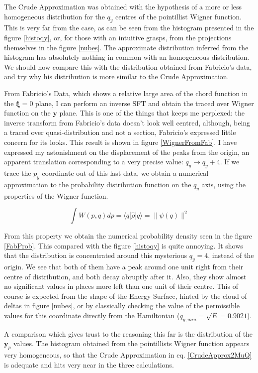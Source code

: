 \documentclass[a4paper,12pt]{article}
\newcommand{\yfase}{\mathbf{y}}
\newcommand{\xifase}{ {\boldsymbol{\xi}} }
\newcommand{\bra}[1]{\langle #1|}
\newcommand{\ket}[1]{|#1\rangle}
\begin{document}
The Crude Approximation was obtained with the hypothesis of
a more or less homogeneous distribution for the $q_y$ centres of the
pointillist Wigner function. This is very far from the case, as can
be seen from the histogram presented in the figure \ref{histoqy},
or, for those with an intuitive grasps, from the projections themselves in
the figure \ref{nubes}. The approximate distribution
inferred from the histogram has absolutely nothing in common
with an homogeneous distribution.  We should now compare this with the distribution
obtained from Fabricio's data, and try why his distribution is more similar to
the Crude Approximation.

From Fabricio's Data, which shows a relative large area of
the chord function in the $\xifase=0$ plane, I can perform an inverse
SFT and obtain the traced over Wigner function on the $\yfase$ plane. This is
one of the things that keeps me perplexed: the inverse transform from Fabricio's data
doesn't look well centred, although, being a traced over quasi-distribution and not
a section, Fabricio's expressed little concern for its looks. This result is shown
in figure \ref{WignerFromFab}. I have expressed my astonishment on the displacement
of the peaks from the origin, an apparent translation corresponding
to a very precise value: $q_y \rightarrow q_y+4$. If we trace the $p_y$ coordinate
out of this last data, we obtain a numerical approximation to the probability
distribution function on the $q_y$ axis, using the properties of the
Wigner function.

\begin{equation}
\int W(p,q) d p = \bra{q}\hat{\rho}\ket{q} = \| \psi (q) \|^2
\end{equation}

From this property we obtain the numerical probability density 
seen in the figure \ref{FabProb}. This compared with the figure \ref{histoqy}
is quite annoying. It shows that the distribution is concentrated around this
mysterious $q_y=4$, instead of the origin. We see that both of them have a peak around
one unit right from their centre of distribution, and both decay abruptly after it.
Also, they show almost no significant values in places more left than 
one unit of their centre. This of course is expected from the shape of the
Energy Surface, hinted by the cloud of deltas in figure \ref{nubes}, or
by classically checking the value of the permissible values for this coordinate
directly from the Hamiltonian ($q_{y,min}=\sqrt{E}=0.9021$). 

A comparison which gives trust to the reasoning this far is
the distribution of the $\yfase_p$ values. The histogram obtained
from the pointillists Wigner function appears very homogeneous, so
that the Crude Approximation in eq. \ref{CrudeApprox2MuQ} is adequate
and hits very near in the three calculations.
\end{document}
